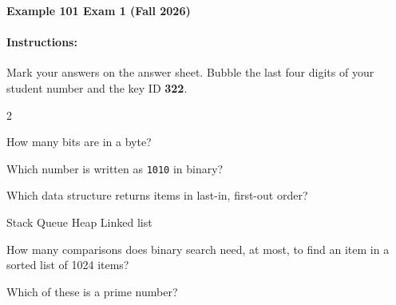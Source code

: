 \documentclass{exam}
\begin{document}

\begin{center}
{\LARGE \bf Example 101 Exam 1 (Fall 2026)}
\end{center}

\vspace{.5in}
\noindent{}
\vspace{0.1in}

\paragraph{Instructions:} Mark your answers on the answer sheet. Bubble the last
four digits of your student number and the key ID \textbf{322}.

\begin{multicols}{2}
\begin{questions}

\question
How many bits are in a byte?
\begin{choices}
\end{choices}

\question
Which number is written as \texttt{1010} in binary?
\begin{choices}
\end{choices}

\question
Which data structure returns items in last-in, first-out order?
\begin{choices}
    \correctchoice Stack
    \choice Queue
    \choice Heap
    \choice Linked list
\end{choices}

\question
How many comparisons does binary search need, at most, to find an item in a
sorted list of 1024 items?
\begin{choices}
\end{choices}

\question
Which of these is a prime number?
\begin{choices}
\end{choices}


\end{questions}
\end{multicols}
\end{document}
